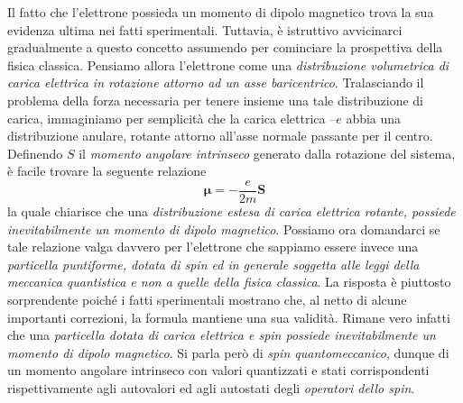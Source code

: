 Il fatto che l’elettrone possieda un momento di dipolo magnetico trova la sua evidenza ultima nei fatti sperimentali. Tuttavia, è istruttivo avvicinarci gradualmente a questo concetto assumendo per cominciare la prospettiva della fisica classica.
Pensiamo allora l’elettrone come una \emph{distribuzione volumetrica di carica elettrica in rotazione attorno ad un asse baricentrico}. Tralasciando il problema della forza necessaria per tenere insieme una tale distribuzione di carica, immaginiamo per semplicità che la carica elettrica $–e$ abbia una distribuzione anulare, rotante attorno all’asse normale passante per il centro.
Definendo $S$ il \emph{momento angolare intrinseco} generato dalla rotazione del sistema, è facile trovare la seguente relazione
\[
\bm{\mu} = - \frac{e}{2m} \bm{S}
\]
la quale chiarisce che una \emph{distribuzione estesa di carica elettrica rotante, possiede inevitabilmente un momento di dipolo magnetico}.
Possiamo ora domandarci se tale relazione valga davvero per l’elettrone che sappiamo essere invece una \emph{particella puntiforme, dotata di spin ed in generale soggetta alle leggi della meccanica quantistica e non a quelle della fisica classica}. La risposta è piuttosto sorprendente poiché i fatti sperimentali mostrano che, al netto di alcune importanti correzioni, la formula mantiene una sua validità. Rimane vero infatti che una \emph{particella dotata di carica elettrica e spin possiede inevitabilmente un momento di dipolo magnetico}. Si parla però di \emph{spin quantomeccanico}, dunque di un momento angolare intrinseco con valori quantizzati e stati corrispondenti rispettivamente agli autovalori ed agli autostati degli \emph{operatori dello spin}.

